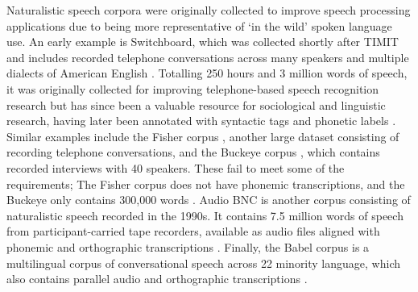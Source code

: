 Naturalistic speech corpora were originally collected to improve speech processing applications due to being more representative of `in the wild' spoken language use. An early example is Switchboard, which was collected shortly after TIMIT and includes recorded telephone conversations across many speakers and multiple dialects of American English \citep{godfrey1992switchboard}. Totalling 250 hours and 3 million words of speech, it was originally collected for improving telephone-based speech recognition research but has since been a valuable resource for sociological and linguistic research, having later been annotated with syntactic tags and phonetic labels \rough{[citations]}. Similar examples include the Fisher corpus \citep{cieri2004fisher}, another large dataset consisting of recording telephone conversations, and the Buckeye corpus \citep{pitt2007buckeye}, which contains recorded interviews with 40 speakers. These fail to meet some of the requirements; The Fisher corpus does not have phonemic transcriptions, and the Buckeye only contains 300,000 words \citep{pitt2007buckeye}. Audio BNC is another corpus consisting of naturalistic speech recorded in the 1990s. It contains 7.5 million words of speech from participant-carried tape recorders, available as audio files aligned with phonemic and orthographic transcriptions \citep{coleman2012audio}. Finally, the Babel corpus is a multilingual corpus of conversational speech across 22 minority language, which also contains parallel audio and orthographic transcriptions \citep{harper2011babel}. 



